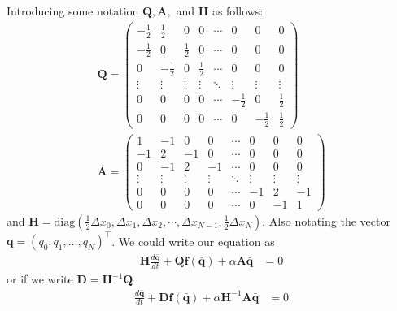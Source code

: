 \documentclass{article}
\theoremstyle{definition}
\begin{document}
    Introducing some notation $\mathbf{Q}, \mathbf{A},$ and $\mathbf{H}$ as follows:
    \begin{align}
        \mathbf{Q} = \begin{pmatrix}
                - \frac12         & \frac12            & 0              & 0               & \cdots & 0        & 0         & 0 \\
                -\frac{1}{2} & 0             & \frac{1}{2}    & 0               & \cdots & 0        & 0         & 0 \\
                0            & - \frac{1}{2} & 0              & \frac{1}{2}     & \cdots & 0        & 0         & 0 \\
                \vdots       & \vdots        & \vdots         & \vdots          & \ddots & \vdots   & \vdots    & \vdots \\
                0            & 0             & 0              & 0               & \cdots & -\frac{1}{2} & 0      & \frac{1}{2} \\
                0            & 0             & 0              & 0               & \cdots & 0        & -\frac12      & \frac12
        \end{pmatrix} \\[6pt]
        \mathbf{A} = \begin{pmatrix}
            {1}           &{-1}            & 0              & 0               & \cdots & 0        & 0         & 0 \\
            -1           & 2             & -1    & 0               & \cdots & 0        & 0         & 0 \\
            0            & -1            & 2              & -1      & \cdots & 0        & 0         & 0 \\
            \vdots       & \vdots        & \vdots         & \vdots          & \ddots & \vdots   & \vdots    & \vdots \\
            0            & 0             & 0              & 0               & \cdots & -1  & 2      & -1 \\
            0            & 0             & 0              & 0               & \cdots & 0        & -1      & 1 
        \end{pmatrix}
    \end{align}
    and $\mathbf{H} =  \text{diag} (\frac{1}{2}\Delta x_0,\Delta x_1,\Delta x_2,\cdots,\Delta x_{N-1},\frac{1}{2}\Delta x_N)$. 
    Also notating the vector $\mathbf{q} = (q_0, q_1, \dots, q_N)^\top $.
    We could write our equation as 
    \begin{align}
        \mathbf{H}\frac{d\bar{\mathbf{q}}}{dt} + \mathbf{Q}\mathbf{f}(\bar{\mathbf{q}}) 
            + \alpha \mathbf{A}\bar{\mathbf{q}} &= 0
    \end{align}
    or if we write $\mathbf{D}=\mathbf{H}^{-1}\mathbf{Q}$
    \begin{align}
        \frac{d\bar{\mathbf{q}}}{dt} + \mathbf{D}\mathbf{f}(\bar{\mathbf{q}}) 
            + \alpha \mathbf{H}^{-1}\mathbf{A}\bar{\mathbf{q}} &= 0
    \end{align}
    
\end{document}
